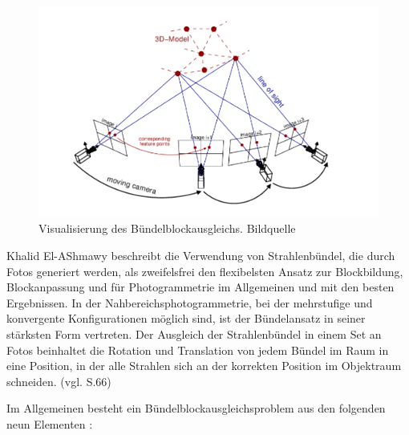 \begin{figure}[H]
	\centering
	\includegraphics[scale=0.6]{bundle.png}
	\caption{Visualisierung des Bündelblockausgleichs. Bildquelle \cite{efficient_bundle}}
\end{figure}

Khalid El-AShmawy \cite{comparative_conditions_study} beschreibt die Verwendung von Strahlenbündel, die durch Fotos generiert werden, als zweifelsfrei den flexibelsten Ansatz zur Blockbildung, Blockanpassung und für Photogrammetrie im Allgemeinen und mit den besten Ergebnissen. In der Nahbereichsphotogrammetrie, bei der mehrstufige und konvergente Konfigurationen möglich sind, ist der Bündelansatz in seiner stärksten Form vertreten. 
Der Ausgleich der Strahlenbündel in einem Set an Fotos beinhaltet die Rotation und Translation von jedem Bündel im Raum in eine Position, in der alle Strahlen sich an der korrekten Position im Objektraum schneiden. (vgl. \cite{comparative_conditions_study} S.66)

Im Allgemeinen besteht ein Bündelblockausgleichsproblem aus den folgenden neun Elementen \cite{bundle_adjustment}:

